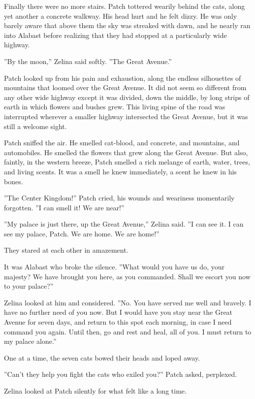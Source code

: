 \documentclass[11pt]{article}
\begin{document}
 Finally there were no more stairs. Patch tottered wearily behind the cats, along yet another a concrete walkway. His head hurt and he felt dizzy. He was only barely aware that above them the sky was streaked with dawn, and he nearly ran into Alabast before realizing that they had stopped at a particularly wide highway.\par
 ''By the moon,'' Zelina said softly. ''The Great Avenue.''\par
 Patch looked up from his pain and exhaustion, along the endless silhouettes of mountains that loomed over the Great Avenue. It did not seem so different from any other wide highway %
 except it was divided, down the middle, by long strips of earth in which flowers and bushes grew. This living spine of the road was interrupted wherever a smaller highway intersected the Great Avenue, but it was still a welcome sight.\par
Patch sniffed the air. He smelled cat-blood, and concrete, and mountains, and automobiles. He smelled the flowers that grew along the Great Avenue. But also, faintly, in the western breeze, Patch smelled a rich melange of earth, water, trees, and living scents. It was a smell he knew immediately, a scent he knew in his bones.\par
''The Center Kingdom!'' Patch cried, his wounds and weariness momentarily forgotten. ''I can smell it! We are near!''\par
''My palace is just there, up the Great Avenue,'' Zelina said. ''I can see it. I can see my palace, Patch. We are home. We are home!''\par
They stared at each other in amazement.\par
It was Alabast who broke the silence. ''What would you have us do, your majesty? We have brought you here, as you commanded. Shall we escort you now to your palace?''\par
Zelina looked at him and considered. ''No. You have served me well and bravely. I have no further need of you now. But I would have you stay near the Great Avenue for seven days, and return to this spot each morning, in case I need command you again. Until then, go and rest and heal, all of you. I must return to my palace alone.''\par
One at a time, the seven cats bowed their heads and loped away.\par
''Can't they help you fight the cats who exiled you?'' Patch asked, perplexed.\par
Zelina looked at Patch silently for what felt like a long time.\par
\end{document}
